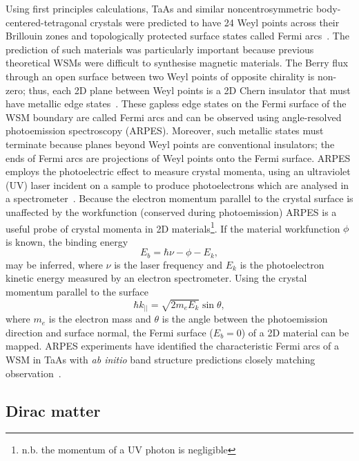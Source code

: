 \documentclass[11pt, a4paper]{article}
\begin{document}
Using first principles calculations, TaAs and similar noncentrosymmetric body-centered-tetragonal
crystals were predicted to have 24 Weyl points across their Brillouin zones and topologically protected
surface states called Fermi arcs~\cite{TaAs_abin}.
The prediction of such materials was particularly important because
previous theoretical WSMs were difficult to synthesise magnetic materials. 
The Berry flux through an open surface between two Weyl points of opposite chirality is non-zero;
thus, each 2D plane between Weyl points is a 2D Chern insulator that must
have metallic edge states~\cite{WSMfermiarc}. These gapless edge states on the Fermi surface
of the WSM boundary are called Fermi arcs and
can be observed using angle-resolved photoemission spectroscopy (ARPES).
Moreover, such metallic states must terminate because planes beyond Weyl points are conventional
insulators; the ends of Fermi arcs are projections of Weyl points onto the Fermi surface.
ARPES employs the photoelectric effect to measure crystal momenta, 
using an ultraviolet (UV) laser incident on a sample to produce
photoelectrons which are analysed in a spectrometer~\cite{ARPES_thry}.
Because the electron momentum parallel to the crystal surface is unaffected by the workfunction
(conserved during photoemission) ARPES is a useful probe of crystal momenta
in 2D materials\footnote{n.b. the momentum of a UV photon is negligible}.
If the material workfunction $\phi$
is known, the binding energy 
\begin{equation}
  E_b = \hbar \nu - \phi - E_k,
\end{equation}
may be inferred, where $\nu$ is the laser frequency and $E_k$ is the photoelectron kinetic
energy measured by an electron spectrometer. Using the
crystal momentum parallel to the surface
\begin{equation}
  \hbar k_{||} = \sqrt{2m_e E_k}\sin{\theta},
\end{equation}
where $m_e$ is the electron mass and $\theta$ is the angle between the photoemission direction 
and surface normal,
the Fermi surface ($E_b = 0$) of a 2D material can be mapped.
ARPES experiments have identified the characteristic Fermi arcs of a WSM
in TaAs with \textit{ab initio} band structure predictions closely matching
observation~\cite{TaAs_exp}.


\subsection{Dirac matter}
\end{document}
